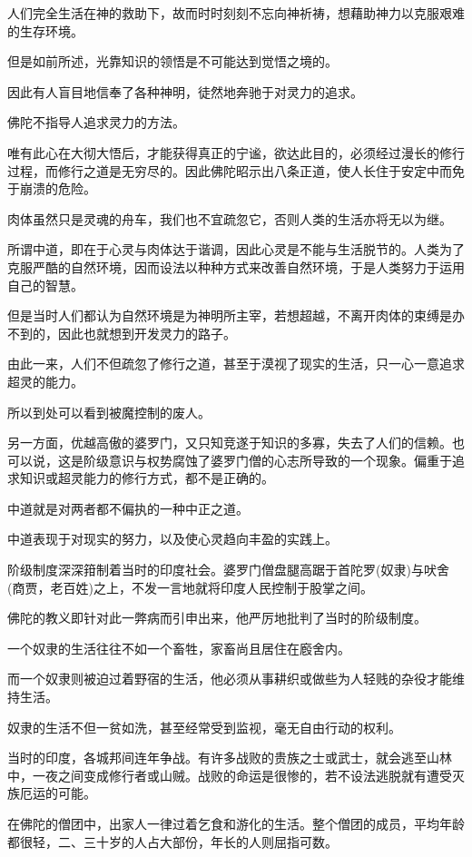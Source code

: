\documentclass[twoside,openany]{book}
\begin{document}
人们完全生活在神的救助下，故而时时刻刻不忘向神祈祷，想藉助神力以克服艰难的生存环境。

但是如前所述，光靠知识的领悟是不可能达到觉悟之境的。

因此有人盲目地信奉了各种神明，徒然地奔驰于对灵力的追求。

佛陀不指导人追求灵力的方法。

唯有此心在大彻大悟后，才能获得真正的宁谧，欲达此目的，必须经过漫长的修行过程，而修行之道是无穷尽的。因此佛陀昭示出八条正道，使人长住于安定中而免于崩溃的危险。

肉体虽然只是灵魂的舟车，我们也不宜疏忽它，否则人类的生活亦将无以为继。

所谓中道，即在于心灵与肉体达于谐调，因此心灵是不能与生活脱节的。人类为了克服严酷的自然环境，因而设法以种种方式来改善自然环境，于是人类努力于运用自己的智慧。

但是当时人们都认为自然环境是为神明所主宰，若想超越，不离开肉体的束缚是办不到的，因此也就想到开发灵力的路子。

由此一来，人们不但疏忽了修行之道，甚至于漠视了现实的生活，只一心一意追求超灵的能力。

所以到处可以看到被魔控制的废人。

另一方面，优越高傲的婆罗门，又只知竞遂于知识的多寡，失去了人们的信赖。也可以说，这是阶级意识与权势腐蚀了婆罗门僧的心志所导致的一个现象。偏重于追求知识或超灵能力的修行方式，都不是正确的。

中道就是对两者都不偏执的一种中正之道。

中道表现于对现实的努力，以及使心灵趋向丰盈的实践上。

阶级制度深深箝制着当时的印度社会。婆罗门僧盘腿高踞于首陀罗(奴隶)与吠舍(商贾，老百姓)之上，不发一言地就将印度人民控制于股掌之间。

佛陀的教义即针对此一弊病而引申出来，他严厉地批判了当时的阶级制度。

一个奴隶的生活往往不如一个畜牲，家畜尚且居住在廏舍内。

而一个奴隶则被迫过着野宿的生活，他必须从事耕织或做些为人轻贱的杂役才能维持生活。

奴隶的生活不但一贫如洗，甚至经常受到监视，毫无自由行动的权利。

当时的印度，各城邦间连年争战。有许多战败的贵族之士或武士，就会逃至山林中，一夜之间变成修行者或山贼。战败的命运是很惨的，若不设法逃脱就有遭受灭族厄运的可能。

在佛陀的僧团中，出家人一律过着乞食和游化的生活。整个僧团的成员，平均年龄都很轻，二、三十岁的人占大部份，年长的人则屈指可数。
\end{document}
